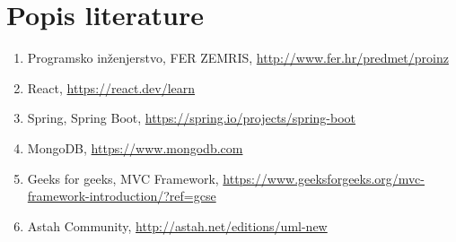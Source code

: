 \chapter*{Popis literature}
	 	
	
		
		
		\begin{enumerate}
			
			
			\item  Programsko inženjerstvo, FER ZEMRIS, \url{http://www.fer.hr/predmet/proinz}
			
			\item  React, \url{https://react.dev/learn}
			
			\item  Spring,  Spring Boot,  \url{https://spring.io/projects/spring-boot}
			
			\item  MongoDB, \url{https://www.mongodb.com}
			
			\item  Geeks for geeks, MVC Framework, \url{https://www.geeksforgeeks.org/mvc-framework-introduction/?ref=gcse}
			
			\item  Astah Community, \url{http://astah.net/editions/uml-new}
		\end{enumerate}
		
		 